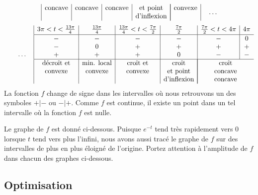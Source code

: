 {\[\begin{array}{|c|c|c|c|c|c|}
\text{concave} & \text{concave} & \text{concave} & \text{et point} &
\multicolumn{2}{|c|}{\text{convexe}} \\
 & & & \text{d'inflexion} & \multicolumn{2}{|c|}{}
\end{array} \quad \ldots
\]
\[
\qquad \ldots \quad
\begin{array}{|c|c|c|c|c|c}
\rule[-0.5em]{0em}{1em}
3\pi<t<\frac{13\pi}{4} & \frac{13\pi}{4} &
\frac{13\pi}{4}<t<\frac{7\pi}{2} & \frac{7\pi}{2} & \frac{7\pi}{2}<t<4\pi &
4\pi \\
\hline
- & - & - & - & - & 0 \\
- & 0 & + & + & + & + \\
+ & + & + & 0 & - & - \\
\hline
\text{décroît et} & \text{min. local} & \text{croît et} & \text{croît}
& \multicolumn{2}{|c}{\text{croît}} \\
\text{convexe} & \text{convexe} & \text{convexe} & \text{et point}
& \multicolumn{2}{|c}{\text{concave}} \\
 & & & \text{d'inflexion} & \multicolumn{2}{|c}{\text{concave}}
\end{array}
\]
La fonction $f$ change de signe dans les intervalles où nous retrouvons un des
symboles $+|-$ ou $-|+$.  Comme $f$ est continue, il existe un point dans
un tel intervalle où la fonction $f$ est nulle.

Le graphe de $f$ est donné ci-dessous.  Puisque $e^{-t}$ tend très
rapidement vers $0$ lorsque $t$ tend vers plus l'infini, nous avons aussi tracé
le graphe de $f$ sur des intervalles de plus en plus éloigné de l'origine.
Portez attention à l'amplitude de $f$ dans chacun des graphes
ci-dessous.
}

\subsection{Optimisation}


